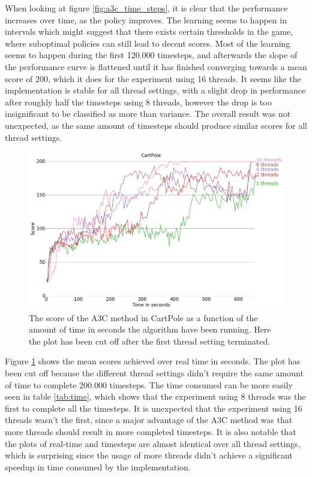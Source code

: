\documentclass[11pt]{article}
\begin{document}
When looking at figure \ref{fig:a3c_time_steps}, it is clear that the
performance increases over time, as the policy improves.
The learning seems to happen in intervals which might suggest
that there exists certain thresholds in the game, where
suboptimal policies can still lead to decent scores.
Most of the learning seems to happen during the first 120.000 timesteps,
and afterwards the slope of the performance curve
is flattened until it has finished converging towards a mean score
of 200, which it does for the experiment using 16 threads.
It seems like the implementation is stable for all thread settings, with a slight
drop in performance after roughly half the timesteps using 8 threads,
however the drop is too insignificant to be classified as more than variance.
The overall result was not unexpected, as the same amount of timesteps should produce similar
scores for all thread settings. 

\begin{figure}[H]
    \centering
    \includegraphics[scale=0.4]{plots/cartpole_compare_time_without_AC.png}
    \caption{The score of the A3C method in CartPole as a function
    of the amount of time in seconds the algorithm have been running.
    Here the plot has been cut off after the first thread setting
    terminated.}
    \label{fig:a3c_time}
\end{figure}

Figure \ref{fig:a3c_time} shows the mean scores achieved over real time in seconds.
The plot has been cut off because the different thread settings didn't require the
same amount of time to complete 200.000 timesteps.
The time consumed can be more easily seen in table \ref{tab:time}, which shows that
the experiment using 8 threads was the first to complete all the timesteps.
It is unexpected that the experiment using 16 threads wasn't the first,
since a major advantage of the A3C method was that more threads should
result in more completed timesteps.
It is also notable that the plots of real-time and timesteps are almost identical
over all thread settings, which is surprising since the usage of more
threads didn't achieve a significant speedup
in time consumed by the implementation.
\end{document}

